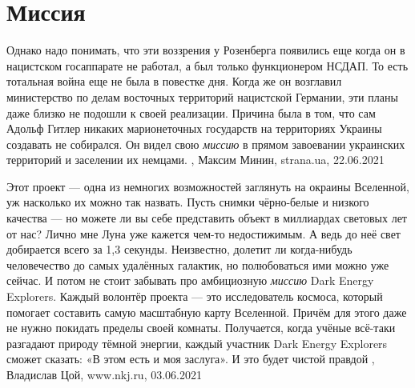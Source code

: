  
 
 
 
 
\chapter{Миссия}
\label{sec:slova.missia}

Однако надо понимать, что эти воззрения у Розенберга появились еще когда он в
нацистском госаппарате не работал, а был только функционером НСДАП. То есть
тотальная война еще не была в повестке дня. Когда же он возглавил министерство
по делам восточных территорий нацистской Германии, эти планы даже близко не
подошли к своей реализации.  Причина была в том, что сам Адольф Гитлер никаких
марионеточных государств на территориях Украины создавать не собирался. Он
видел свою \emph{миссию} в прямом завоевании украинских территорий и заселении их
немцами. 
, 
Максим Минин, strana.ua, 22.06.2021

Этот проект — одна из немногих возможностей заглянуть на окраины Вселенной, уж
насколько их можно так назвать. Пусть снимки чёрно-белые и низкого качества —
но можете ли вы себе представить объект в миллиардах световых лет от нас? Лично
мне Луна уже кажется чем-то недостижимым. А ведь до неё свет добирается всего
за 1,3 секунды. Неизвестно, долетит ли когда-нибудь человечество до самых
удалённых галактик, но полюбоваться ими можно уже сейчас.  И потом не стоит
забывать про амбициозную \emph{миссию} Dark Energy Explorers. Каждый волонтёр проекта
— это исследователь космоса, который помогает составить самую масштабную карту
Вселенной. Причём для этого даже не нужно покидать пределы своей комнаты.
Получается, когда учёные всё-таки разгадают природу тёмной энергии, каждый
участник Dark Energy Explorers сможет сказать: «В этом есть и моя заслуга». И
это будет чистой правдой
, 
Владислав Цой, www.nkj.ru, 03.06.2021

